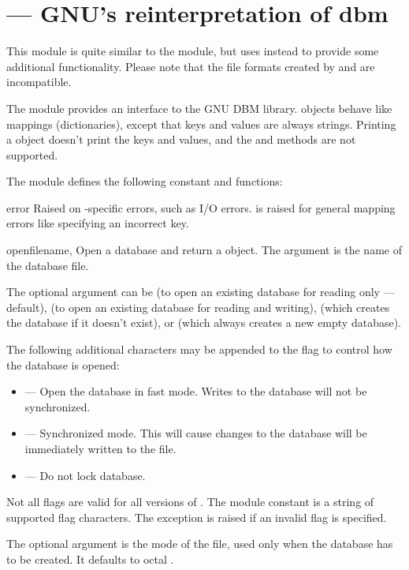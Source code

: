 \section{ ---
         GNU's reinterpretation of dbm}



This module is quite similar to the 
module, but uses  instead to provide some additional
functionality.  Please note that the file formats created by
 and  are incompatible.

The  module provides an interface to the GNU DBM
library.   objects behave like mappings
(dictionaries), except that keys and values are always strings.
Printing a  object doesn't print the keys and values, and
the  and  methods are not supported.

The module defines the following constant and functions:

\begin{excdesc}{error}
Raised on -specific errors, such as I/O errors.
 is raised for general mapping errors like
specifying an incorrect key.
\end{excdesc}

\begin{funcdesc}{open}{filename, }
Open a  database and return a  object.  The
 argument is the name of the database file.

The optional  argument can be
 (to open an existing database for reading only --- default),
 (to open an existing database for reading and writing),
 (which creates the database if it doesn't exist), or
 (which always creates a new empty database).

The following additional characters may be appended to the flag to
control how the database is opened:

\begin{itemize}
\item {} --- Open the database in fast mode.  Writes to the database
                     will not be synchronized.
\item {} --- Synchronized mode. This will cause changes to the database
                     will be immediately written to the file.
\item {} --- Do not lock database. 
\end{itemize}

Not all flags are valid for all versions of .  The
module constant  is a string of supported flag
characters.  The exception  is raised if an invalid
flag is specified.

The optional  argument is the \UNIX{} mode of the file, used
only when the database has to be created.  It defaults to octal
.
\end{funcdesc}

